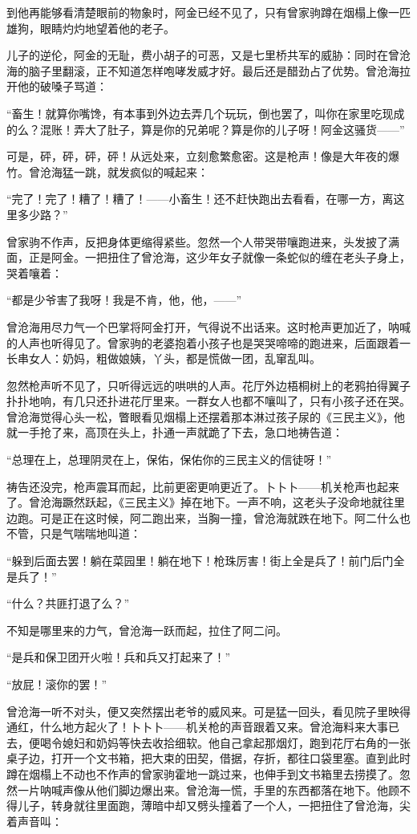 \par 到他再能够看清楚眼前的物象时，阿金已经不见了，只有曾家驹蹲在烟榻上像一匹雄狗，眼睛灼灼地望着他的老子。
\par 儿子的逆伦，阿金的无耻，费小胡子的可恶，又是七里桥共军的威胁：同时在曾沧海的脑子里翻滚，正不知道怎样咆哮发威才好。最后还是醋劲占了优势。曾沧海拉开他的破嗓子骂道：
\par “畜生！就算你嘴馋，有本事到外边去弄几个玩玩，倒也罢了，叫你在家里吃现成的么？混账！弄大了肚子，算是你的兄弟呢？算是你的儿子呀！阿金这骚货——”
\par 可是，砰，砰，砰，砰！从远处来，立刻愈繁愈密。这是枪声！像是大年夜的爆竹。曾沧海猛一跳，就发疯似的喊起来：
\par “完了！完了！糟了！糟了！——小畜生！还不赶快跑出去看看，在哪一方，离这里多少路？”
\par 曾家驹不作声，反把身体更缩得紧些。忽然一个人带哭带嚷跑进来，头发披了满面，正是阿金。一把扭住了曾沧海，这少年女子就像一条蛇似的缠在老头子身上，哭着嚷着：
\par “都是少爷害了我呀！我是不肯，他，他，——”
\par 曾沧海用尽力气一个巴掌将阿金打开，气得说不出话来。这时枪声更加近了，呐喊的人声也听得见了。曾家驹的老婆抱着小孩子也是哭哭啼啼的跑进来，后面跟着一长串女人：奶妈，粗做娘姨，丫头，都是慌做一团，乱窜乱叫。
\par 忽然枪声听不见了，只听得远远的哄哄的人声。花厅外边梧桐树上的老鸦拍得翼子扑扑地响，有几只还扑进花厅里来。一群女人也都不嚷叫了，只有小孩子还在哭。曾沧海觉得心头一松，瞥眼看见烟榻上还摆着那本淋过孩子尿的《三民主义》，他就一手抢了来，高顶在头上，扑通一声就跪了下去，急口地祷告道：
\par “总理在上，总理阴灵在上，保佑，保佑你的三民主义的信徒呀！”
\par 祷告还没完，枪声震耳而起，比前更密更响更近了。卜卜卜——机关枪声也起来了。曾沧海蹶然跃起，《三民主义》掉在地下。一声不响，这老头子没命地就往里边跑。可是正在这时候，阿二跑出来，当胸一撞，曾沧海就跌在地下。阿二什么也不管，只是气喘喘地叫道：
\par “躲到后面去罢！躺在菜园里！躺在地下！枪珠厉害！街上全是兵了！前门后门全是兵了！”
\par “什么？共匪打退了么？”
\par 不知是哪里来的力气，曾沧海一跃而起，拉住了阿二问。
\par “是兵和保卫团开火啦！兵和兵又打起来了！”
\par “放屁！滚你的罢！”
\par 曾沧海一听不对头，便又突然摆出老爷的威风来。可是猛一回头，看见院子里映得通红，什么地方起火了！卜卜卜——机关枪的声音跟着又来。曾沧海料来大事已去，便喝令媳妇和奶妈等快去收拾细软。他自己拿起那烟灯，跑到花厅右角的一张桌子边，打开一个文书箱，把大束的田契，借据，存折，都往口袋里塞。直到此时蹲在烟榻上不动也不作声的曾家驹霍地一跳过来，也伸手到文书箱里去捞摸了。忽然一片呐喊声像从他们脚边爆出来。曾沧海一慌，手里的东西都落在地下。他顾不得儿子，转身就往里面跑，薄暗中却又劈头撞着了一个人，一把扭住了曾沧海，尖着声音叫：
